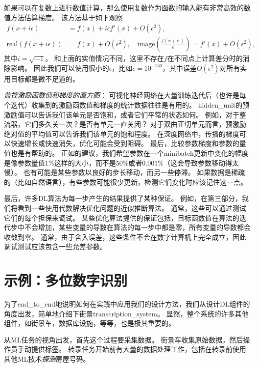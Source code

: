 如果可以在复数上进行数值计算，那么使用复数作为函数的输入能有非常高效的数值方法估算梯度\citep{Squire+Trapp-1998}。
该方法基于如下观察
\begin{align}
	f(x + i\epsilon) &= f(x) + i\epsilon f'(x) + O(\epsilon^2) ,\\
	\text{real}( f(x+i\epsilon) ) &= f(x) + O(\epsilon^2), \quad \text{image}( \frac{f(x+i\epsilon)}{ \epsilon } ) = f'(x) + O(\epsilon^2),
\end{align}
其中$i=\sqrt{-1}$。
和上面的实值情况不同，这里不存在$f$在不同点上计算差分时的消除影响。
因此我们可以使用很小的$\epsilon$，比如$\epsilon = 10^{-150}$，其中误差$O(\epsilon^2)$对所有实用目标都是微不足道的。


\emph{监控激励函数值和梯度的直方图}：
可视化神经网络在大量训练迭代后（也许是每个迭代）收集到的激励函数值和梯度的统计数据往往是有用的。
\gls{hidden_unit}的预激励值可以告诉我们该单元是否饱和，或者它们平常的状态如何。
例如，对于整流器，它们多久关一次？是否有单元一直关闭？
对于双曲正切单元而言，预激励绝对值的平均值可以告诉我们该单元的饱和程度。
在深度网络中，传播的梯度可以快速增长或快速消失，优化可能会受到阻碍。
最后，比较参数梯度和参数的量值也是有帮助的。
正如\citep{Bottou-DLSS2015}的建议，我们希望参数在一个\gls{minibatch}更新中变化的幅度是像参数量值$1\%$这样的大小，而不是$50\%$或者$0.001\%$（这会导致参数移动得太慢）。
也有可能是某些参数以良好的步长移动，而另一些停滞。
如果数据是稀疏的（比如自然语言），有些参数可能很少更新，检测它们变化时应该记住这一点。


最后，许多\gls{DL}算法为每一步产生的结果提供了某种保证。
例如，在第三部分，我们将看到一些使用代数解决优化问题的近似推断算法。
通常，这些可以通过测试它们的每个担保来调试。
某些优化算法提供的保证包括，目标函数值在算法的迭代步中不会增加，某些变量的导数在算法的每一步中都是零，所有变量的导数都会收敛到零。
通常，由于舍入误差，这些条件不会在数字计算机上完全成立，因此调试测试应该包含一些允差参数。

\section{示例：多位数字识别}
\label{sec:example_multi_digit_number_recognition}
为了\gls{end_to_end}地说明如何在实践中应用我们的设计方法，我们从设计\gls{DL}组件的角度出发，简单地介绍下街景\gls{transcription_system}。
显然，整个系统的许多其他组件，如街景车，数据库设施，等等，也是极其重要的。

从\gls{ML}任务的视角出发，首先这个过程要采集数据。
街景车收集原始数据，然后操作员手动提供标签。
转录任务开始前有大量的数据处理工作，包括在转录前使用其他\gls{ML}技术\emph{探测}房屋号码。

